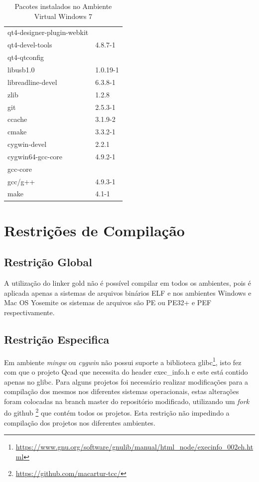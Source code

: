 \begin{itemize}
\begin{table}[h]
\begin{tabular}{ll}
qt4-designer-plugin-webkit  & \\
qt4-devel-tools & 4.8.7-1 \\ 
qt4-qtconfig & \\ \midrule

libusb1.0 & 1.0.19-1 \\ \midrule


libreadline-devel & 6.3.8-1 \\ \midrule

zlib & 1.2.8 \\ \midrule
git & 2.5.3-1 \\ \midrule
ccache & 3.1.9-2 \\ \midrule
cmake & 3.3.2-1 \\ \midrule
cygwin-devel & 2.2.1 \\ \midrule
cygwin64-gcc-core & 4.9.2-1 \\ \midrule
gcc-core & \\ \midrule
gcc/g++ & 4.9.3-1 \\ 
make & 4.1-1 \\ \bottomrule
\end{tabular} 
\caption{Pacotes instalados no Ambiente Virtual Windows 7}
\label{pacotes_instalados_windows}
\end{table}

\end{itemize}



\section{Restrições de Compilação}

\subsection{Restrição Global}
    A utilização do linker gold não é possível compilar em todos os ambientes,
 pois é aplicada apenas a sistemas de arquivos binários ELF e nos ambientes
 Windows e Mac OS Yosemite os sistemas de arquivos são PE ou PE32+ e PEF 
respectivamente.

\subsection{Restrição Especifica}
    Em ambiente \textit{mingw} ou \textit{cygwin} não possui suporte
 a biblioteca glibc\footnote{
\url{https://www.gnu.org/software/gnulib/manual/html\_node/execinfo\_002eh.html}},
 isto fez com que o projeto Qcad que necessita do header exec\_info.h e
 este está contido apenas no glibc.
    Para alguns projetos foi necessário realizar modificações para a compilação
 dos mesmos nos diferentes sistemas operacionais,
estas alterações foram colocadas na branch master do repositório modificado,
utilizando um \textit{fork} do github
\footnote{\url{https://github.com/macartur-tcc/}} que contém todos os projetos.
 Esta restrição não impedindo a compilação dos projetos nos diferentes ambientes.





